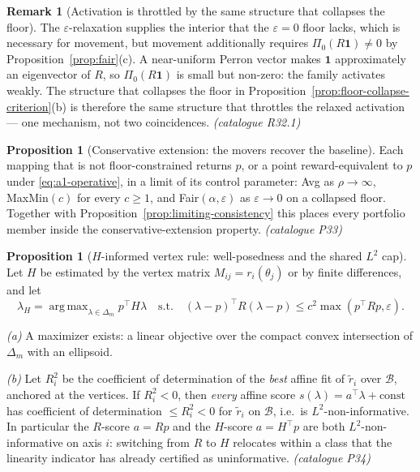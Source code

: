 \documentclass[12pt,a4paper]{report}
\newcommand{\1}{\mathbf{1}}
\newcommand{\Bset}{\mathcal{B}}
\newcommand{\Pz}{\Pi_{0}}
\DeclareMathOperator*{\argmax}{arg\,max}
\theoremstyle{definition}
\newtheorem{remark}[definition]{Remark}
\newtheorem{proposition}[definition]{Proposition}
\begin{document}
\begin{remark}[Activation is throttled by the same structure that collapses the floor]
\label{rem:fair-activation}
The \(\varepsilon\)-relaxation supplies the interior that the \(\varepsilon=0\) floor lacks, which is necessary for movement, but movement additionally requires \(\Pz(R\1)\ne0\) by Proposition~\ref{prop:fair}(c). A near-uniform Perron vector makes \(\1\) approximately an eigenvector of \(R\), so \(\Pz(R\1)\) is small but non-zero: the family activates weakly. The structure that collapses the floor in Proposition~\ref{prop:floor-collapse-criterion}(b) is therefore the same structure that throttles the relaxed activation --- one mechanism, not two coincidences. \emph{(catalogue R32.1)}
\end{remark}

\begin{proposition}[Conservative extension: the movers recover the baseline]
\label{prop:conservative-extension}
Each mapping that is not floor-constrained returns \(p\), or a point reward-equivalent to \(p\) under \eqref{eq:a1-operative}, in a limit of its control parameter: Avg as \(\rho\to\infty\), MaxMin\((c)\) for every \(c\ge1\), and Fair\((\alpha,\varepsilon)\) as \(\varepsilon\to0\) on a collapsed floor. Together with Proposition~\ref{prop:limiting-consistency} this places every portfolio member inside the conservative-extension property. \emph{(catalogue P33)}
\end{proposition}

\begin{proposition}[\(H\)-informed vertex rule: well-posedness and the shared \(L^2\) cap]
\label{prop:l2-cap}
Let \(H\) be estimated by the vertex matrix \(M_{ij}=r_i(\theta_j)\) or by finite differences, and let
\[
\lambda_H=\argmax_{\lambda\in\Delta_m}p^\top H\lambda
\quad\text{s.t.}\quad
(\lambda-p)^\top R(\lambda-p)\le c^2\max(p^\top Rp,\varepsilon).
\]

\emph{(a)} A maximizer exists: a linear objective over the compact convex intersection of \(\Delta_m\) with an ellipsoid.

\emph{(b)} Let \(R^2_i\) be the coefficient of determination of the \emph{best} affine fit of \(\tilde r_i\) over \(\Bset\), anchored at the vertices. If \(R^2_i<0\), then \emph{every} affine score \(s(\lambda)=a^\top\lambda+\mathrm{const}\) has coefficient of determination \(\le R^2_i<0\) for \(\tilde r_i\) on \(\Bset\), i.e.\ is \(L^2\)-non-informative. In particular the \(R\)-score \(a=Rp\) and the \(H\)-score \(a=H^\top p\) are both \(L^2\)-non-informative on axis \(i\): switching from \(R\) to \(H\) relocates within a class that the linearity indicator has already certified as uninformative. \emph{(catalogue P34)}
\end{proposition}
\end{document}
